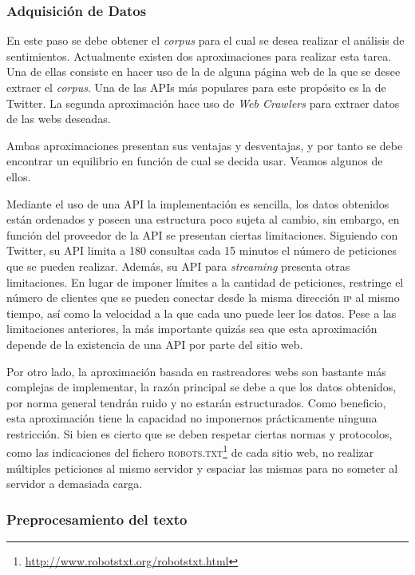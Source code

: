 \subsubsection{Adquisición de Datos}
\label{sec:dataacq}

En este paso se debe obtener el \emph{corpus} para el cual se desea realizar el
análisis de sentimientos. Actualmente existen dos aproximaciones para realizar
esta tarea. Una de ellas consiste en hacer uso de la  de
alguna página web de la que se desee extraer el \emph{corpus}. Una de las
\acp{API} más populares para este propósito es la de Twitter. La segunda
aproximación hace uso de \emph{Web Crawlers} para
extraer datos de las webs deseadas.

Ambas aproximaciones presentan sus ventajas y desventajas, y por tanto se debe
encontrar un equilibrio en función de cual se decida usar. Veamos algunos de
ellos.

Mediante el uso de una \ac{API} la implementación es sencilla, los datos
obtenidos están ordenados y poseen una estructura poco sujeta al cambio, sin
embargo, en función del proveedor de la \ac{API} se presentan ciertas
limitaciones. Siguiendo con Twitter, su \ac{API} limita a 180 consultas cada 15
minutos el número de peticiones que se pueden realizar. Además, su \ac{API} para
\emph{streaming} presenta otras limitaciones. En lugar de imponer límites a la
cantidad de peticiones, restringe el número de clientes que se pueden conectar
desde la misma dirección \textsc{ip} al mismo tiempo, así como la velocidad a la
que cada uno puede leer los datos. Pese a las limitaciones anteriores, la más
importante quizás sea que esta aproximación depende de la existencia de una
\ac{API} por parte del sitio web.

Por otro lado, la aproximación basada en rastreadores webs son bastante más
complejas de implementar, la razón principal se debe a que los datos obtenidos,
por norma general tendrán ruido y no estarán estructurados. Como beneficio, esta
aproximación tiene la capacidad no imponernos prácticamente ninguna
restricción. Si bien es cierto que se deben respetar ciertas normas y
protocolos, como las indicaciones del fichero
\textsc{robots.txt}\footnote{\url{http://www.robotstxt.org/robotstxt.html}} de
cada sitio web, no realizar múltiples peticiones al mismo servidor y espaciar
las mismas para no someter al servidor a demasiada carga.

\subsubsection{Preprocesamiento del texto}
\label{sec:textpreprocesing}


